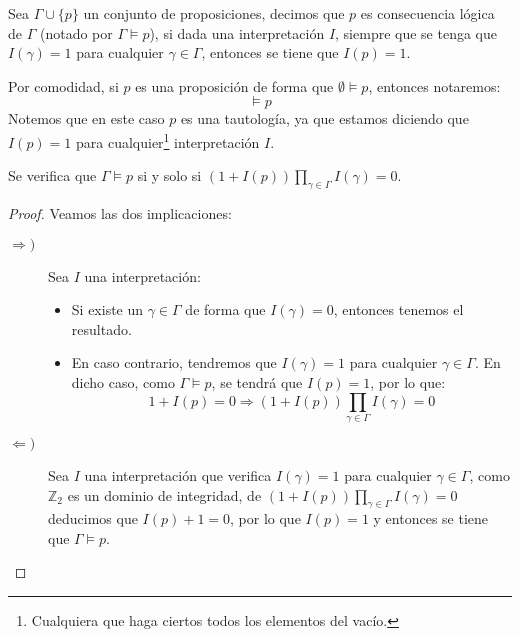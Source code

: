 \begin{definicion}
    Sea $\Gamma\cup\{p\}$ un conjunto de proposiciones, decimos que $p$ es consecuencia lógica de $\Gamma$ (notado por $\Gamma\vDash p$), si dada una interpretación $I$, siempre que se tenga que $I(\gamma) = 1$ para cualquier $\gamma\in \Gamma$, entonces se tiene que $I(p)= 1$.
\end{definicion}

\begin{notacion}
    Por comodidad, si $p$ es una proposición de forma que $\emptyset \vDash p$, entonces notaremos:
    \begin{equation*}
        \vDash p
    \end{equation*}
    Notemos que en este caso $p$ es una tautología, ya que estamos diciendo que $I(p)=1$ para cualquier\footnote{Cualquiera que haga ciertos todos los elementos del vacío.} interpretación $I$.
\end{notacion}

\begin{prop}
    Se verifica que $\Gamma\vDash p$ si y solo si $(1+I(p))\displaystyle\prod_{\gamma\in \Gamma}I(\gamma) = 0$.
    \begin{proof}
        Veamos las dos implicaciones:
    \begin{description}
        \item [$\Longrightarrow)$] 
            Sea $I$ una interpretación:
            \begin{itemize}
                \item Si existe un $\gamma\in \Gamma$ de forma que $I(\gamma)=0$, entonces tenemos el resultado.
                \item En caso contrario, tendremos que $I(\gamma)=1$ para cualquier $\gamma\in \Gamma$. En dicho caso, como $\Gamma\vDash p$, se tendrá que $I(p)=1$, por lo que:
                    \begin{equation*}
                        1 + I(p) = 0 \Longrightarrow (1+I(p))\displaystyle\prod_{\gamma\in \Gamma}I(\gamma) = 0
                    \end{equation*}
            \end{itemize}
        \item [$\Longleftarrow)$] 
            Sea $I$ una interpretación que verifica $I(\gamma)=1$ para cualquier $\gamma\in \Gamma$, como $\mathbb{Z}_2$ es un dominio de integridad, de $(1+I(p))\displaystyle\prod_{\gamma\in \Gamma}I(\gamma) = 0$ deducimos que $I(p) +1=0$, por lo que $I(p) = 1$ y entonces se tiene que $\Gamma\vDash p$.
    \end{description}
    \end{proof}
\end{prop}

